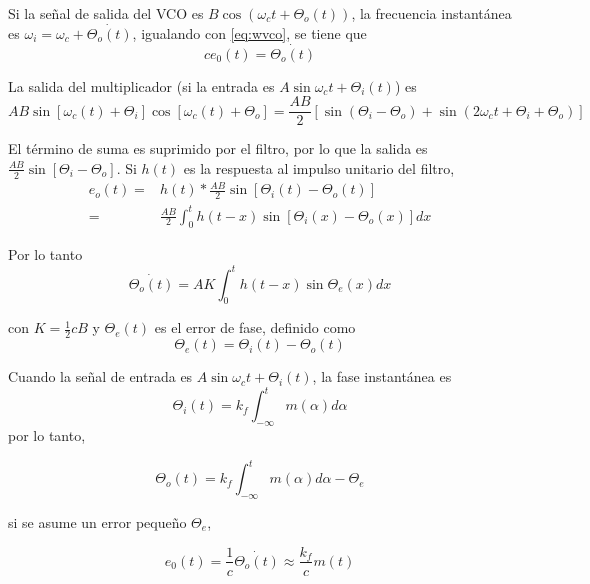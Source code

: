 \documentclass[12pt,letterpaper,titlepage,twoside]{book}
\begin{document}
Si la señal de salida del VCO es $B \cos ( \omega_c t + \Theta_o(t) )$, la frecuencia instantánea es $\omega_i = \omega_c + \dot{\Theta_o (t)}$, igualando con \ref{eq:wvco}, se tiene que 
\begin{equation}
c e_0(t) = \dot{\Theta_o (t)}
\end{equation}


La salida del multiplicador (si la entrada es $A\sin \omega_ct + \Theta_i(t)$) es
\begin{equation}
AB \sin \left[ \omega_c(t) + \Theta_i \right] \cos \left[ \omega_c(t) + \Theta_o \right] = \frac{AB}{2} \left[ \sin (\Theta_i - \Theta_o) + \sin (2 \omega_ct +\Theta_i + \Theta_o)\right] 
\end{equation}

El término de suma es suprimido por el filtro, por lo que la salida es $\frac{AB}{2}  \sin \left[\Theta_i - \Theta_o \right]$. Si $h(t)$ es la respuesta al impulso unitario del filtro, 
\begin{align}
e_o(t) =& h(t) \ast \frac{AB}{2} \sin \left[  \Theta_i(t) - \Theta_o(t) \right]\\
=& \frac{AB}{2} \int_0^t h(t-x)\sin \left[  \Theta_i(x) - \Theta_o(x) \right] dx
\end{align}

Por lo tanto 
\begin{equation}
\dot{\Theta_o(t)} = AK \int_0^t h(t-x)\sin \Theta_e(x) dx
\end{equation}

con $K = \frac{1}{2}cB$ y $\Theta_e(t)$ es el error de fase, definido como 
\begin{equation}
\Theta_e(t) = \Theta_i(t)-\Theta_o(t)
\end{equation}
 
 Cuando la señal de entrada es $A\sin \omega_ct + \Theta_i(t)$, la fase instantánea es 
 \begin{equation}
 \Theta_i(t) = k_f \int_{-\infty}^t m(\alpha) d\alpha
 \end{equation}
 por lo tanto, 

\begin{equation}
 \Theta_o(t) = k_f \int_{-\infty}^t m(\alpha) d\alpha - \Theta_e
 \end{equation}
 
 si se asume un error pequeño $\Theta_e$,
 
\begin{equation}
e_0(t) = \frac{1}{c}\dot{\Theta_o (t)} \approx \frac{k_f}{c}m(t)
\end{equation} 
 
\end{document}
